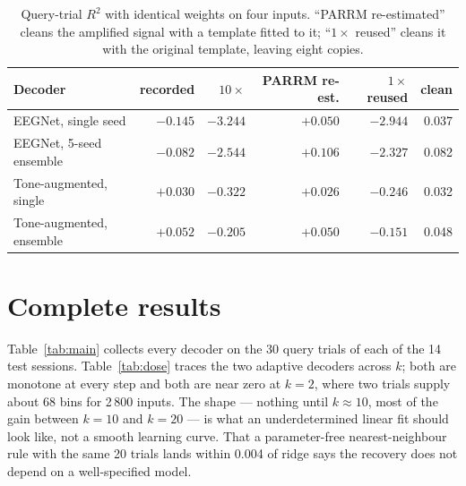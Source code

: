 \documentclass[11pt]{article}
\newcommand{\Rtwo}{R^{2}}
\begin{document}
\begin{table}[!t]
\centering
\small
\caption{Query-trial $\Rtwo$ with identical weights on four inputs. ``PARRM re-estimated''
cleans the amplified signal with a template fitted to it; ``$1\times$ reused'' cleans it with
the original template, leaving eight copies.}
\label{tab:tenx}
\begin{tabular}{@{}lrrrrr@{}}
\toprule
Decoder & recorded & $10\times$ & PARRM re-est. & $1\times$ reused & clean \\
\midrule
EEGNet, single seed      & $-0.145$ & $-3.244$ & $+0.050$ & $-2.944$ & 0.037 \\
EEGNet, 5-seed ensemble  & $-0.082$ & $-2.544$ & $+0.106$ & $-2.327$ & 0.082 \\
Tone-augmented, single   & $+0.030$ & $-0.322$ & $+0.026$ & $-0.246$ & 0.032 \\
Tone-augmented, ensemble & $+0.052$ & $-0.205$ & $+0.050$ & $-0.151$ & 0.048 \\
\bottomrule
\end{tabular}
\end{table}

\section{Complete results}
\label{app:results}

Table~\ref{tab:main} collects every decoder on the 30 query trials of each of the 14 test
sessions. Table~\ref{tab:dose} traces the two adaptive decoders across $k$; both are monotone
at every step and both are near zero at $k=2$, where two trials supply about 68 bins for
2\,800 inputs. The shape --- nothing until $k\approx10$, most of the gain between $k=10$ and
$k=20$ --- is what an underdetermined linear fit should look like, not a smooth learning
curve. That a parameter-free nearest-neighbour rule with the same 20 trials lands within 0.004
of ridge says the recovery does not depend on a well-specified model.
\end{document}
